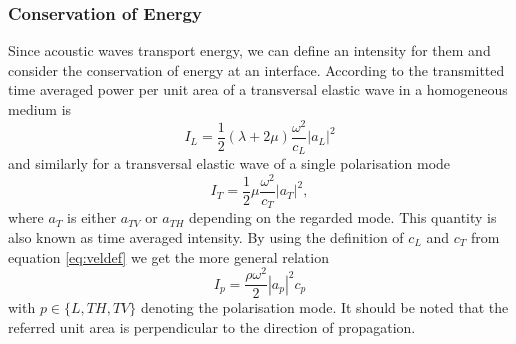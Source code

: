 \subsubsection{Conservation of Energy} \label{sec:sanitycheck}
Since acoustic waves transport energy, we can define an intensity for them and
consider the conservation of energy at an interface.
According to \cite[166]{achenbach1973wave} the transmitted time averaged power
per unit area of a transversal elastic wave in a homogeneous medium is
\begin{equation}
    I_L = \frac{1}{2}(\lambda+2\mu)\frac{\omega^2}{c_L}|a_L|^2
\end{equation}
and similarly for a transversal elastic wave of a single polarisation mode
\begin{equation}
    I_T = \frac{1}{2}\mu\frac{\omega^2}{c_T}|a_T|^2,
\end{equation}
where $a_T$ is either $a_{TV}$ or $a_{TH}$ depending on the regarded mode. This
quantity is also known as time averaged intensity. By using the definition of
$c_L$ and $c_T$ from equation \ref{eq:veldef} we get the more general relation
\begin{equation} \label{eq:generalIntensity}
    I_p = \frac{\rho\omega^2}{2} |a_p|^2 c_p
\end{equation}
with $p\in \{L,TH, TV\}$ denoting the polarisation mode. It should be noted
that the referred unit area is perpendicular to the direction of propagation.

